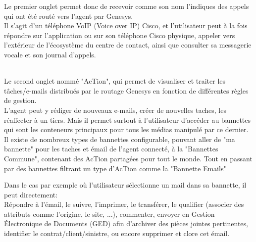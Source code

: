 \documentclass{rapport}
\begin{document}
\vspace{5mm} %
\begin{minipage}{0.65\textwidth}
Le premier onglet permet donc de recevoir comme son nom l'indiques des appels qui ont été routé vers l'agent par Genesys. \\

Il s'agit d'un téléphone VoIP (Voice over IP) Cisco, et l'utilisateur peut à la fois répondre sur l'application ou sur son téléphone Cisco physique, appeler vers l'extérieur de l'écosystème du centre de contact, ainsi que consulter sa messagerie vocale et son journal d'appels.\\

\end{minipage}
\begin{minipage}{0.25\textwidth}
\end{minipage}
\vspace{5mm} %
\noindent
\\

Le second onglet nommé "AcTion", qui permet de visualiser et traiter les tâches/e-mails distribués par le routage Genesys en fonction de différentes règles de gestion.\\

L'agent peut y rédiger de nouveaux e-mails, créer de nouvelles taches, les réaffecter à un tiers. Mais il permet surtout à l'utilisateur d'accéder au bannettes qui sont les conteneurs principaux pour tous les médias manipulé par ce dernier. \\
Il existe de nombreux types de bannettes configurable, pouvant aller de "ma bannette" pour les taches et émail de l'agent connecté, à la "Bannettes Commune", contenant des AcTion partagées pour tout le monde. Tout en passant par des bannettes filtrant un type d'AcTion comme la "Bannette Emails"\\



Dans le cas par exemple où l'utilisateur sélectionne un mail dans sa bannette, il peut directement:\\
Répondre à l'émail, le suivre, l'imprimer, le transférer, le qualifier (associer des attributs comme l'origine, le site, ...), commenter, envoyer en Gestion Électronique de Documents (GED) afin d'archiver des pièces jointes pertinentes, identifier le contrat/client/sinistre, ou encore supprimer et clore cet émail.\\
\end{document}
